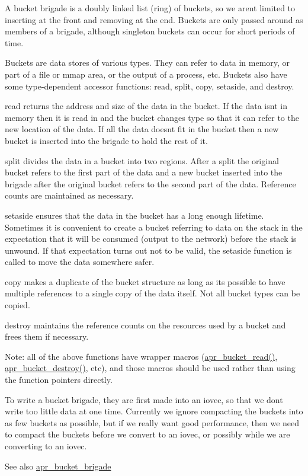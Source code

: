 A bucket brigade is a doubly linked list (ring) of buckets, so we aren\textquotesingle{}t limited to inserting at the front and removing at the end. Buckets are only passed around as members of a brigade, although singleton buckets can occur for short periods of time.

Buckets are data stores of various types. They can refer to data in memory, or part of a file or mmap area, or the output of a process, etc. Buckets also have some type-\/dependent accessor functions\+: read, split, copy, setaside, and destroy.

read returns the address and size of the data in the bucket. If the data isn\textquotesingle{}t in memory then it is read in and the bucket changes type so that it can refer to the new location of the data. If all the data doesn\textquotesingle{}t fit in the bucket then a new bucket is inserted into the brigade to hold the rest of it.

split divides the data in a bucket into two regions. After a split the original bucket refers to the first part of the data and a new bucket inserted into the brigade after the original bucket refers to the second part of the data. Reference counts are maintained as necessary.

setaside ensures that the data in the bucket has a long enough lifetime. Sometimes it is convenient to create a bucket referring to data on the stack in the expectation that it will be consumed (output to the network) before the stack is unwound. If that expectation turns out not to be valid, the setaside function is called to move the data somewhere safer.

copy makes a duplicate of the bucket structure as long as it\textquotesingle{}s possible to have multiple references to a single copy of the data itself. Not all bucket types can be copied.

destroy maintains the reference counts on the resources used by a bucket and frees them if necessary.

Note\+: all of the above functions have wrapper macros (\hyperlink{group__APR__Util__Bucket__Brigades_gae44ae938c6c60e148430fdb098dcf28f}{apr\+\_\+bucket\+\_\+read()}, \hyperlink{group__APR__Util__Bucket__Brigades_gafc0dae1e90a798284ed777a0c9e90ec6}{apr\+\_\+bucket\+\_\+destroy()}, etc), and those macros should be used rather than using the function pointers directly.

To write a bucket brigade, they are first made into an iovec, so that we don\textquotesingle{}t write too little data at one time. Currently we ignore compacting the buckets into as few buckets as possible, but if we really want good performance, then we need to compact the buckets before we convert to an iovec, or possibly while we are converting to an iovec.\begin{DoxySeeAlso}{See also}
\hyperlink{structapr__bucket__brigade}{apr\+\_\+bucket\+\_\+brigade} 
\end{DoxySeeAlso}
